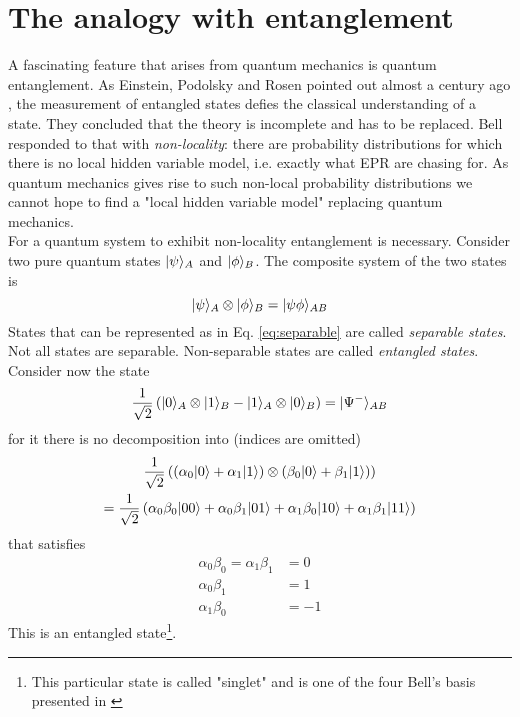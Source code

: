 \section{The analogy with entanglement}
	A fascinating feature that arises from quantum mechanics is quantum entanglement. As Einstein, Podolsky and Rosen pointed out almost a century ago \cite{einstein1935}, 
	the measurement of entangled states defies the classical understanding of a state. 
	They concluded that the theory is incomplete and has to be replaced.
	Bell responded to that with \emph{non-locality}\cite{Bell64}: there are probability distributions for which there is no local hidden variable model, i.e. exactly what EPR are chasing for.
	As quantum mechanics gives rise to such non-local probability distributions we cannot hope to find a "local hidden variable model" replacing quantum mechanics.\\
	
	For a quantum system to exhibit non-locality entanglement is necessary.
	Consider two pure quantum states $|\psi \rangle_A$ and $|\phi \rangle_B$.
	The composite system of the two states is
	\begin{equation}\label{eq:separable}
		|\psi \rangle_A \otimes |\phi \rangle_B = |\psi\phi \rangle_{AB}
	\end{equation}
	States that can be represented as in Eq. \ref{eq:separable} are called \emph{separable states}.
	Not all states are separable. Non-separable states are called \emph{entangled states}.
	Consider now the state
	\begin{equation}
		\frac{1}{\sqrt{2}}\left(|0 \rangle_A\otimes|1 \rangle_B - |1 \rangle_A\otimes|0 \rangle_B\right) = |\Psi^{-} \rangle_{AB}
	\end{equation}
	for it there is no decomposition into (indices are omitted)
	\begin{multline}
		\frac{1}{\sqrt{2}}\left( (\alpha_0|0 \rangle+\alpha_1|1 \rangle)\otimes (\beta_0|0 \rangle + \beta_1|1 \rangle) \right) \\
		= \frac{1}{\sqrt{2}} \left( \alpha_0\beta_0|00 \rangle + \alpha_0\beta_1|01 \rangle + \alpha_1\beta_0|10 \rangle + \alpha_1\beta_1|11 \rangle \right)
	\end{multline}
	that satisfies 
	\begin{align*}
	\alpha_0\beta_0 = \alpha_1\beta_1 & = 0 \\
	\alpha_0\beta_1 & = 1\\
	\alpha_1\beta_0 & = -1
	\end{align*}
	This is an entangled state\footnote{This particular state is called "singlet" and is one of the four Bell's basis presented in \cite{Bell64}}.
	
